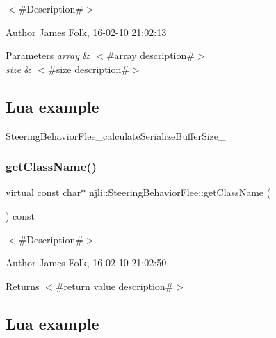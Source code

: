 $<$\#\+Description\#$>$ 

\begin{DoxyAuthor}{Author}
James Folk, 16-\/02-\/10 21\+:02\+:13
\end{DoxyAuthor}

\begin{DoxyParams}{Parameters}
{\em array} & $<$\#array description\#$>$ \\
\hline
{\em size} & $<$\#size description\#$>$\\
\hline
\end{DoxyParams}
\hypertarget{classnjli_1_1_steering_behavior_wander_ex1}{}\subsection{Lua example}\label{classnjli_1_1_steering_behavior_wander_ex1}

\begin{DoxyCodeInclude}
\end{DoxyCodeInclude}
Steering\+Behavior\+Flee\+\_\+calculate\+Serialize\+Buffer\+Size\+\_\+ \mbox{\label{classnjli_1_1_steering_behavior_flee_a95a04847e0acbf1a64df40835af28a3c}} 
\subsubsection{\texorpdfstring{get\+Class\+Name()}{getClassName()}}
{\footnotesize\ttfamily virtual const char$\ast$ njli\+::\+Steering\+Behavior\+Flee\+::get\+Class\+Name (\begin{DoxyParamCaption}{ }\end{DoxyParamCaption}) const\hspace{0.3cm}{\ttfamily [virtual]}}



$<$\#\+Description\#$>$ 

\begin{DoxyAuthor}{Author}
James Folk, 16-\/02-\/10 21\+:02\+:50
\end{DoxyAuthor}
\begin{DoxyReturn}{Returns}
$<$\#return value description\#$>$
\end{DoxyReturn}
\hypertarget{classnjli_1_1_steering_behavior_wander_ex1}{}\subsection{Lua example}\label{classnjli_1_1_steering_behavior_wander_ex1}

